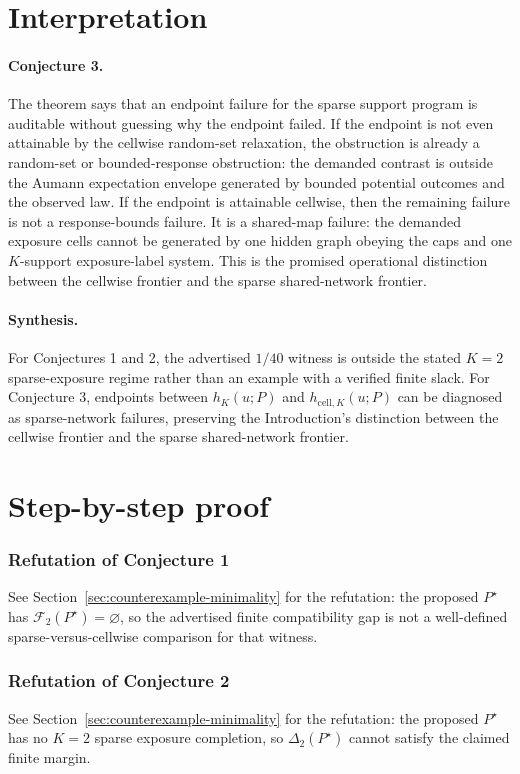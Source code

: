 \documentclass[11pt]{article}
\theoremstyle{definition}
\theoremstyle{plain}
\theoremstyle{remark}
\begin{document}
\section{Interpretation}
\paragraph{Conjecture 3.}
The theorem says that an endpoint failure for the sparse support program is auditable without guessing why the endpoint failed.  If the endpoint is not even attainable by the cellwise random-set relaxation, the obstruction is already a random-set or bounded-response obstruction: the demanded contrast is outside the Aumann expectation envelope generated by bounded potential outcomes and the observed law.  If the endpoint is attainable cellwise, then the remaining failure is not a response-bounds failure.  It is a shared-map failure: the demanded exposure cells cannot be generated by one hidden graph obeying the caps and one \(K\)-support exposure-label system.  This is the promised operational distinction between the cellwise frontier and the sparse shared-network frontier.

\paragraph{Synthesis.}
For Conjectures 1 and 2, the advertised \(1/40\) witness is outside the stated \(K=2\) sparse-exposure regime rather than an example with a verified finite slack.  For Conjecture 3, endpoints between \(h_K(u;P)\) and \(h_{\mathrm{cell},K}(u;P)\) can be diagnosed as sparse-network failures, preserving the Introduction's distinction between the cellwise frontier and the sparse shared-network frontier.

\section{Step-by-step proof}
\subsubsection*{Refutation of Conjecture 1}
See Section~\ref{sec:counterexample-minimality} for the refutation: the proposed \(P^\star\) has \(\mathcal F_2(P^\star)=\varnothing\), so the advertised finite compatibility gap is not a well-defined sparse-versus-cellwise comparison for that witness.

\subsubsection*{Refutation of Conjecture 2}
See Section~\ref{sec:counterexample-minimality} for the refutation: the proposed \(P^\star\) has no \(K=2\) sparse exposure completion, so \(\Delta_2(P^\star)\) cannot satisfy the claimed finite margin.
\end{document}
